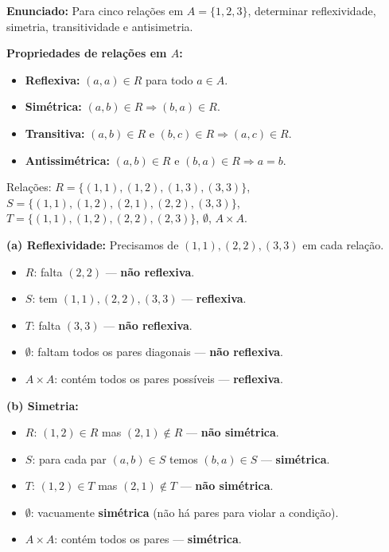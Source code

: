 \documentclass[12pt,a4paper]{article}
\begin{document}
\textbf{Enunciado:} Para cinco relações em $A = \{1,2,3\}$, determinar reflexividade, simetria, transitividade e antisimetria.

\begin{teoribox}
\textbf{Propriedades de relações em $A$:}
\begin{itemize}
  \item \textbf{Reflexiva:} $(a,a) \in R$ para todo $a \in A$.
  \item \textbf{Simétrica:} $(a,b) \in R \Rightarrow (b,a) \in R$.
  \item \textbf{Transitiva:} $(a,b) \in R$ e $(b,c) \in R \Rightarrow (a,c) \in R$.
  \item \textbf{Antissimétrica:} $(a,b) \in R$ e $(b,a) \in R \Rightarrow a = b$.
\end{itemize}
\end{teoribox}

Relações: $R = \{(1,1),(1,2),(1,3),(3,3)\}$, $S = \{(1,1),(1,2),(2,1),(2,2),(3,3)\}$, $T = \{(1,1),(1,2),(2,2),(2,3)\}$, $\emptyset$, $A \times A$.

\textbf{(a) Reflexividade:} Precisamos de $(1,1),(2,2),(3,3)$ em cada relação.
\begin{itemize}
  \item $R$: falta $(2,2)$ --- \textbf{não reflexiva}.
  \item $S$: tem $(1,1),(2,2),(3,3)$ --- \textbf{reflexiva}.
  \item $T$: falta $(3,3)$ --- \textbf{não reflexiva}.
  \item $\emptyset$: faltam todos os pares diagonais --- \textbf{não reflexiva}.
  \item $A \times A$: contém todos os pares possíveis --- \textbf{reflexiva}.
\end{itemize}

\textbf{(b) Simetria:}
\begin{itemize}
  \item $R$: $(1,2) \in R$ mas $(2,1) \notin R$ --- \textbf{não simétrica}.
  \item $S$: para cada par $(a,b) \in S$ temos $(b,a) \in S$ --- \textbf{simétrica}.
  \item $T$: $(1,2) \in T$ mas $(2,1) \notin T$ --- \textbf{não simétrica}.
  \item $\emptyset$: vacuamente \textbf{simétrica} (não há pares para violar a condição).
  \item $A \times A$: contém todos os pares --- \textbf{simétrica}.
\end{itemize}
\end{document}
